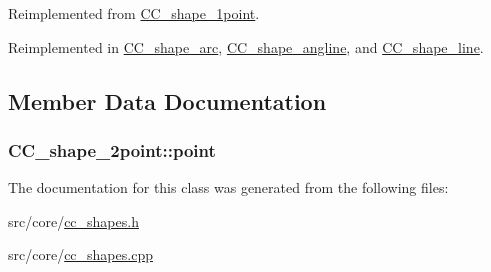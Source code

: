 Reimplemented from \hyperlink{a00038_a7110a3e16f7375074baa18efb997060a}{C\-C\-\_\-shape\-\_\-1point}.



Reimplemented in \hyperlink{a00041_ac99e4b812a5eb489d29d324cd7dca7e5}{C\-C\-\_\-shape\-\_\-arc}, \hyperlink{a00040_a3aead16af5b691651d76d1d71138aae8}{C\-C\-\_\-shape\-\_\-angline}, and \hyperlink{a00043_a8678d21e42e37bece16b3cac98241d98}{C\-C\-\_\-shape\-\_\-line}.



\subsection{Member Data Documentation}
\hypertarget{a00039_acfded64430f596d55972e72349fabde7}{
\subsubsection[{point}]{ C\-C\-\_\-shape\-\_\-2point\-::point\hspace{0.3cm}{\ttfamily [protected]}}}\label{a00039_acfded64430f596d55972e72349fabde7}


The documentation for this class was generated from the following files\-:\begin{DoxyCompactItemize}
\item 
src/core/\hyperlink{a00210}{cc\-\_\-shapes.\-h}\item 
src/core/\hyperlink{a00209}{cc\-\_\-shapes.\-cpp}\end{DoxyCompactItemize}
